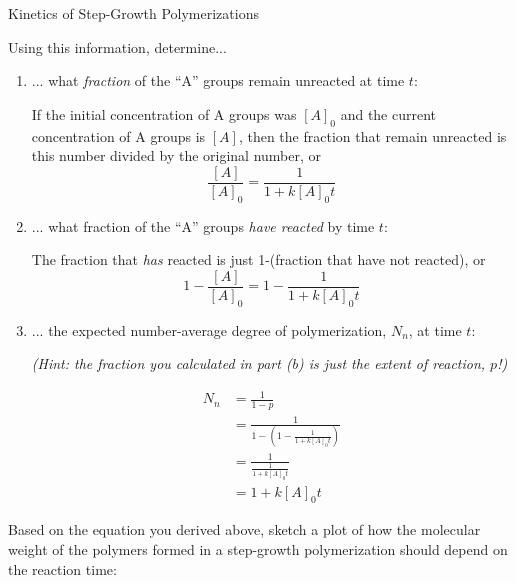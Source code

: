 \begin{activity}{Kinetics of Step-Growth Polymerizations}
\begin{ctqs}

	\question Using this information, determine...
	
		\begin{enumerate}
			\item ... what \emph{fraction} of the ``A'' groups remain unreacted at time $t$:
			
				\begin{solution}[1in]{}
					If the initial concentration of A groups was $[A]_0$ and the current concentration of A groups is $[A]$, then the fraction that remain unreacted is this number divided by the original number, or
					\begin{equation*}
						\frac{[A]}{[A]_0} = \frac{1}{1 + k[A]_0 t}
					\end{equation*}
				\end{solution}
			
			\item ... what fraction of the ``A'' groups \emph{have reacted} by time $t$:
			
				\begin{solution}[1in]{}
					The fraction that \emph{has} reacted is just 1-(fraction that have not reacted), or
					\begin{equation*}
						1- \frac{[A]}{[A]_0} = 1-\frac{1}{1 + k[A]_0 t}
					\end{equation*}
				\end{solution}
		
			\item ... the expected number-average degree of polymerization, $N_n$, at time $t$: \label{\labelbase:ctq:catNn}
			
				\emph{(Hint: the fraction you calculated in part (b) is just the extent of reaction, $p$!)}
			
				\begin{solution}[1.75in]{}
					\begin{align*}
						N_n &= \frac{1}{1-p}\\
							&= \frac{1}{1-\left(1- \frac{1}{1 + k[A]_0 t}\right)}\\
							&= \frac{1}{\frac{1}{1 + k[A]_0 t}}\\
							&= 1 + k[A]_0 t
					\end{align*}
				\end{solution}
			
		\end{enumerate}
	
	\question Based on the equation you derived above, sketch a plot of how the molecular weight of the polymers formed in a step-growth polymerization should depend on the reaction time:
	

\end{ctqs}
\end{activity}
